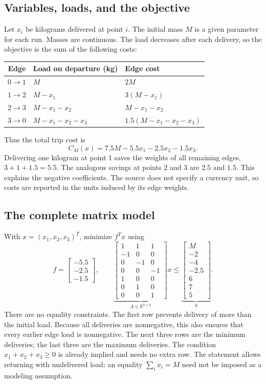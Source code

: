 \documentclass[11pt,a4paper]{article}
\begin{document}
\subsection{Variables, loads, and the objective}
Let $x_i$ be kilograms delivered at point $i$. The initial mass $M$ is a given
parameter for each run. Masses are continuous. The load decreases after each
delivery, so the objective is the sum of the following costs:
\begin{center}
  \begin{tabular}{cll}\toprule
    Edge & Load on departure (kg) & Edge cost\\\midrule
    $0\to1$ & $M$ & $2M$\\
    $1\to2$ & $M-x_1$ & $3(M-x_1)$\\
    $2\to3$ & $M-x_1-x_2$ & $M-x_1-x_2$\\
    $3\to0$ & $M-x_1-x_2-x_3$ & $1.5(M-x_1-x_2-x_3)$\\\bottomrule
  \end{tabular}
\end{center}
Thus the total trip cost is
\[
  C_M(x)=7.5M-5.5x_1-2.5x_2-1.5x_3.
\]
Delivering one kilogram at point 1 saves the weights of all remaining edges,
$3+1+1.5=5.5$. The analogous savings at points 2 and 3 are $2.5$ and $1.5$.
This explains the negative coefficients. The source does not specify a currency
unit, so costs are reported in the units induced by its edge weights.

\subsection{The complete matrix model}
With $x=(x_1,x_2,x_3)^T$, minimize $f^Tx$ using
\[
  f=\begin{bmatrix}-5.5\\-2.5\\-1.5\end{bmatrix},\qquad
  \underbrace{\begin{bmatrix}
      1&1&1\\
      -1&0&0\\0&-1&0\\0&0&-1\\
      1&0&0\\0&1&0\\0&0&1
    \end{bmatrix}}_{A\in\mathbb R^{7\times3}}x
  \leq
  \underbrace{\begin{bmatrix}M\\-2\\-4\\-2.5\\6\\7\\5\end{bmatrix}}_b.
\]
There are no equality constraints. The first row prevents delivery of more
than the initial load. Because all deliveries are nonnegative, this also
ensures that every earlier edge load is nonnegative. The next three rows
are the minimum deliveries; the last three are the maximum deliveries.
The condition $x_1+x_2+x_3\geq0$ is already implied and needs no extra row.
The statement allows returning with undelivered load; an equality
$\sum_i x_i=M$ need not be imposed as a modeling assumption.
\end{document}
